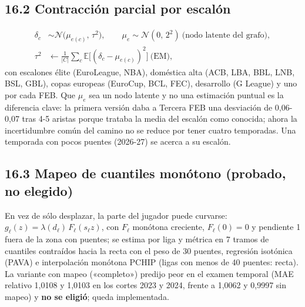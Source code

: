 \documentclass[10pt,a4paper]{article}
\begin{document}
\subsection*{16.2 Contracción parcial por escalón}
\[
\begin{aligned} \delta_c &\sim \mathcal N\!\big(\mu_{e(c)},\, \tau^2\big), \qquad \mu_e \sim \mathcal N(0,\, 2^2)\ \text{(nodo latente del grafo)},\\ \tau^2 &\leftarrow \tfrac{1}{|C|}\textstyle\sum_c \mathbb E\big[(\delta_c - \mu_{e(c)})^2\big]\ \text{(EM)} , \end{aligned}
\]
con escalones élite (EuroLeague, NBA), doméstica alta (ACB, LBA, BBL, LNB, BSL, GBL), copas europeas (EuroCup, BCL, FEC), desarrollo (G League) y uno por cada FEB. Que $\mu_e$ sea un nodo latente y no una estimación puntual es la diferencia clave: la primera versión daba a Tercera FEB una desviación de 0,06-0,07 tras 4-5 aristas porque trataba la media del escalón como conocida; ahora la incertidumbre común del camino no se reduce por tener cuatro temporadas. Una temporada con pocos puentes (2026-27) se acerca a su escalón.

\subsection*{16.3 Mapeo de cuantiles monótono (probado, no elegido)}
En vez de sólo desplazar, la parte del jugador puede curvarse: $g_\ell(z) = \lambda(d_\ell)\,F_\ell(s_\ell z)$, con $F_\ell$ monótona creciente, $F_\ell(0)=0$ y pendiente 1 fuera de la zona con puentes; se estima por liga y métrica en 7 tramos de cuantiles contraídos hacia la recta con el peso de 30 puentes, regresión isotónica (PAVA) e interpolación monótona PCHIP (ligas con menos de 40 puentes: recta). La variante con mapeo («completo») predijo peor en el examen temporal (MAE relativo 1,0108 y 1,0103 en los cortes 2023 y 2024, frente a 1,0062 y 0,9997 sin mapeo) y \textbf{no se eligió}; queda implementada.
\end{document}
